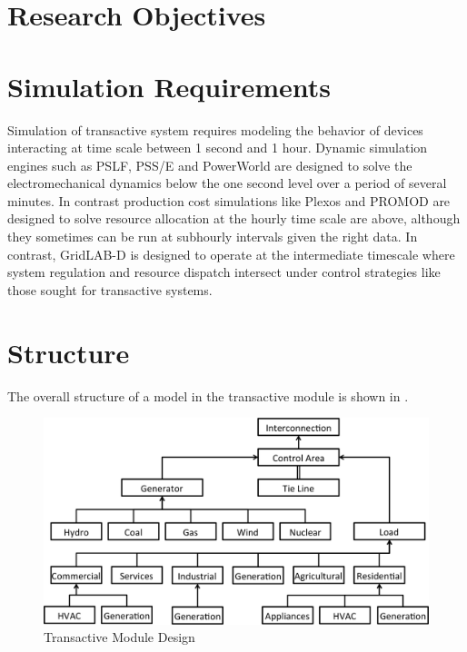 \section{Research Objectives}

\section{Simulation Requirements}

Simulation of transactive system requires modeling the behavior of devices interacting at time scale between 1 second and 1 hour.  Dynamic simulation engines such as PSLF, PSS/E and PowerWorld are designed to solve the electromechanical dynamics below the one second level over a period of several minutes.  In contrast production cost simulations like Plexos and PROMOD are designed to solve resource allocation at the hourly time scale are above, although they sometimes can be run at subhourly intervals given the right data. In contrast, GridLAB-D is designed to operate at the intermediate timescale where system regulation and resource dispatch intersect under control strategies like those sought for transactive systems.


\section{Structure}

The overall structure of a model in the transactive module is shown in .
\begin{figure}[ht]
\centering
\includegraphics[width=\textwidth]{design.png}
\caption{Transactive Module Design}
\label{fig:design}
\end{figure}

